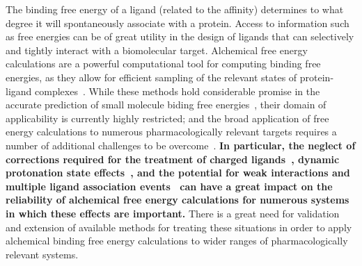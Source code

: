\documentclass[10pt,final]{article}
\begin{document}
The binding free energy of a ligand (related to the affinity) determines to what degree it will spontaneously associate with a protein.
%
Access to information such as free energies can be of great utility in the design of ligands that can selectively and tightly interact with a biomolecular target.
%
Alchemical free energy calculations are a powerful computational tool for computing binding free energies, as they allow for efficient sampling of the relevant states of protein-ligand complexes~\autocite{Shirts2007a}.
%
While these methods hold considerable promise in the accurate prediction of small molecule biding free energies~\autocite{Fujitani2005a,Deng2006a,Wang2015a}, their domain of applicability is currently highly restricted; and the broad application of free energy calculations to numerous pharmacologically relevant targets requires a number of additional challenges to be overcome~\autocite{Chodera2011a,Hansen2014a,Gapsys2015a}. 
%
\textbf{In particular, the neglect of corrections required for the treatment of charged ligands~\autocite{Rocklin2013b,Muddana2014a},
dynamic protonation state effects~\autocite{Dullweber2001a,Aleksandrov2007a,Czodrowski2007a,Steuber2007a,Czodrowski2007b},
and the potential for weak interactions and multiple ligand association events~\autocite{Gilson1997a} can have a great impact on the reliability of alchemical free energy calculations for numerous systems in which these effects are important.
}%
There is a great need for validation and extension of available methods for treating these situations in order to apply alchemical binding free energy calculations to wider ranges of pharmacologically relevant systems.
\end{document}
